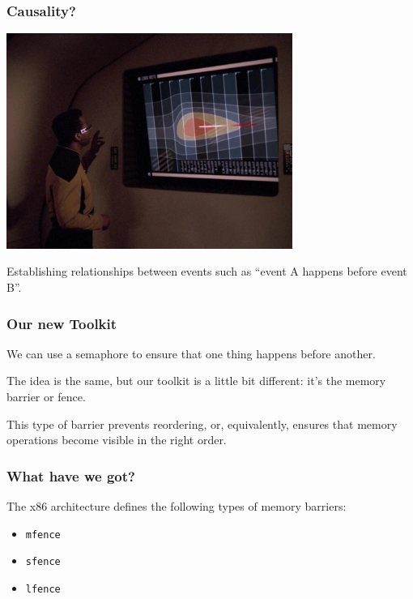 \begin{frame}
\frametitle{Causality?}

\begin{center}
	\includegraphics[width=0.7\textwidth]{images/causality-loop.png}
\end{center}



Establishing relationships between events such as ``event A happens before event B''. 
  
\end{frame}


\begin{frame}
\frametitle{Our new Toolkit}

We can use a semaphore to ensure that one thing happens before another. 

The idea is the same, but our toolkit is a little bit different: it's the \alert{memory barrier} or
\alert{fence}. 

This type of barrier prevents reordering, or,
equivalently, ensures that memory operations become visible in the
right order.

\end{frame}




\begin{frame}
\frametitle{What have we got?}

The x86 architecture defines the following types of memory 
barriers:

\begin{itemize}
\item {\tt mfence}
\item {\tt sfence}
\item {\tt lfence}
\end{itemize}

\end{frame}



